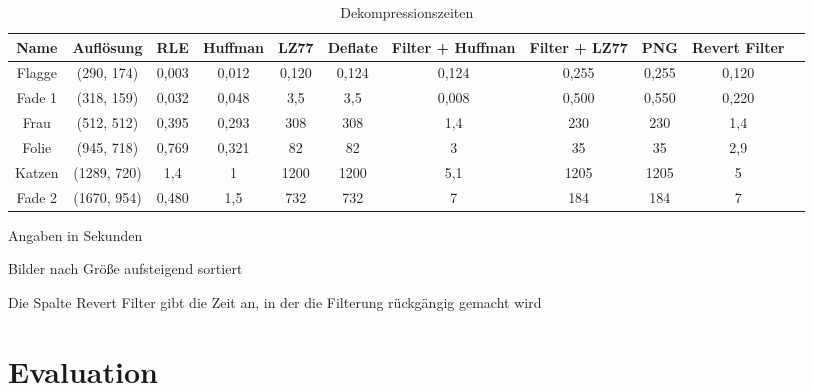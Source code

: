 \documentclass[conference]{IEEEtran}
\begin{document}
  \begin{table}
    \renewcommand*{\arraystretch}{1.1}
    \centering
    \begin{threeparttable}
      \caption{Dekompressionszeiten}
      \label{tab:dekompzeiten}
        \begin{tabular}{c *9{c} S[table-format=5.9]}

        \toprule
        Name    &  Auflösung  & RLE     & Huffman   & LZ77  & Deflate   & Filter + Huffman  & Filter + LZ77     & PNG       & Revert Filter \\
        \midrule
        Flagge  & (290, 174)  & 0,003   & 0,012     & 0,120 & 0,124     & 0,124             & 0,255             & 0,255     & 0,120       \\
        Fade 1  & (318, 159)  & 0,032   & 0,048     & 3,5   & 3,5       & 0,008             & 0,500             & 0,550     & 0,220       \\
        Frau    & (512, 512)  & 0,395   & 0,293     & 308   & 308       & 1,4               & 230               & 230       & 1,4         \\
        Folie   & (945, 718)  & 0,769   & 0,321     & 82    & 82        & 3                 & 35                & 35        & 2,9        \\
        Katzen  & (1289, 720) & 1,4     & 1         & 1200  & 1200      & 5,1               & 1205              & 1205      & 5          \\ 
        Fade 2  & (1670, 954) & 0,480   & 1,5       & 732   & 732       & 7                 & 184               & 184       & 7        
      \end{tabular}
      \par{} Angaben in Sekunden
      \par{} Bilder nach Größe aufsteigend sortiert
      \par{} Die Spalte Revert Filter gibt die Zeit an, in der die Filterung rückgängig gemacht wird
    \end{threeparttable}
  \end{table}





\section{Evaluation}




\end{document}
